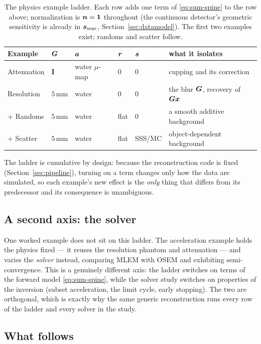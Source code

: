 \begin{table}[h]
  \centering
  \begin{tabular}{@{}llllll@{}}
    \toprule
    Example & $\bm{G}$ & $\bm{a}$ & $\bm{r}$ & $\bm{s}$ & what it isolates \\
    \midrule
    Attenuation & $\mathbf I$ & water $\mu$-map & $0$ & $0$ & cupping and its correction \\
    Resolution  & $5\,\mathrm{mm}$ & water & $0$ & $0$ & the blur $\bm{G}$, recovery of $\bm{G}\bm{x}$ \\
    $+$ Randoms & $5\,\mathrm{mm}$ & water & flat & $0$ & a smooth additive background \\
    $+$ Scatter & $5\,\mathrm{mm}$ & water & flat & SSS/MC & object-dependent background \\
    \bottomrule
  \end{tabular}
  \caption{The physics example ladder. Each row adds one term of
    \eqref{eq:sum-spine} to the row above; normalization is $\bm{n}=\bm1$
    throughout (the continuous detector's geometric sensitivity is already in
    $\bm{s}_{\mathrm{sens}}$, Section~\ref{sec:datamodel}). The first two examples exist; randoms
    and scatter follow.}
  \label{tab:ladder}
\end{table}

The ladder is cumulative by design: because the reconstruction code is fixed
(Section~\ref{sec:pipeline}), turning on a term changes only how the data are
simulated, so each example's new effect is the \emph{only} thing that differs from
its predecessor and its consequence is unambiguous.

\subsection{A second axis: the solver}
\label{sec:summary:solver}

One worked example does not sit on this ladder. The acceleration example holds the
physics fixed --- it reuses the resolution phantom and attenuation --- and varies
the \emph{solver} instead, comparing MLEM with OSEM and exhibiting
semi-convergence. This is a genuinely different axis: the ladder switches on terms
of the forward model \eqref{eq:sum-spine}, while the solver study switches on
properties of the inversion (subset acceleration, the limit cycle, early
stopping). The two are orthogonal, which is exactly why the same generic
reconstruction runs every row of the ladder and every solver in the study.

\subsection{What follows}
\label{sec:summary:next}

